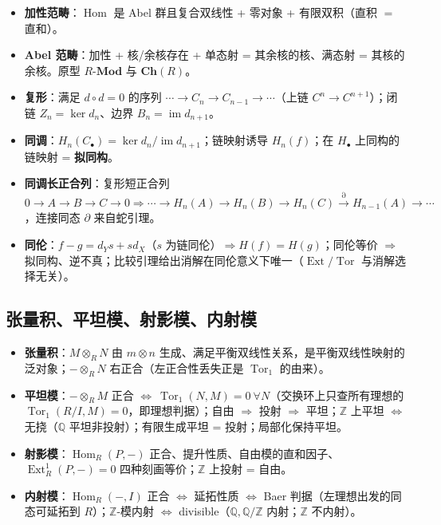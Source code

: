 \documentclass[12pt,a4paper]{ctexart}
\DeclareMathOperator{\Hom}{Hom}
\DeclareMathOperator{\Ext}{Ext}
\DeclareMathOperator{\Tor}{Tor}
\DeclareMathOperator{\im}{im}
\begin{document}
\begin{itemize}
  \item \textbf{加性范畴}：$\Hom$ 是 Abel 群且复合双线性 + 零对象 + 有限双积（直积 $=$ 直和）。
  \item \textbf{Abel 范畴}：加性 + 核/余核存在 + 单态射 = 其余核的核、满态射 = 其核的余核。原型 $R\text{-}\mathbf{Mod}$ 与 $\mathbf{Ch}(R)$。
  \item \textbf{复形}：满足 $d\circ d=0$ 的序列 $\cdots\to C_n\to C_{n-1}\to\cdots$（上链 $C^n\to C^{n+1}$）；闭链 $Z_n=\ker d_n$、边界 $B_n=\im d_{n+1}$。
  \item \textbf{同调}：$H_n(C_\bullet)=\ker d_n/\im d_{n+1}$；链映射诱导 $H_n(f)$；在 $H_\bullet$ 上同构的链映射 = \textbf{拟同构}。
  \item \textbf{同调长正合列}：复形短正合列 $0\to A\to B\to C\to0\Rightarrow\cdots\to H_n(A)\to H_n(B)\to H_n(C)\xrightarrow{\partial}H_{n-1}(A)\to\cdots$，连接同态 $\partial$ 来自蛇引理。
  \item \textbf{同伦}：$f-g=d_Ys+sd_X$（$s$ 为链同伦）$\Rightarrow H(f)=H(g)$；同伦等价 $\Rightarrow$ 拟同构、逆不真；比较引理给出消解在同伦意义下唯一（$\Ext/\Tor$ 与消解选择无关）。
\end{itemize}

\subsection{张量积、平坦模、射影模、内射模}

\begin{itemize}
  \item \textbf{张量积}：$M\otimes_RN$ 由 $m\otimes n$ 生成、满足平衡双线性关系，是平衡双线性映射的泛对象；$-\otimes_RN$ 右正合（左正合性丢失正是 $\Tor_1$ 的由来）。
  \item \textbf{平坦模}：$-\otimes_RM$ 正合 $\Longleftrightarrow\ \Tor_1(N,M)=0\ \forall N$（交换环上只查所有理想的 $\Tor_1(R/I,M)=0$，即理想判据）；自由 $\Rightarrow$ 投射 $\Rightarrow$ 平坦；$\mathbb Z$ 上平坦 $\Longleftrightarrow$ 无挠（$\mathbb Q$ 平坦非投射）；有限生成平坦 = 投射；局部化保持平坦。
  \item \textbf{射影模}：$\Hom_R(P,-)$ 正合、提升性质、自由模的直和因子、$\Ext^1_R(P,-)=0$ 四种刻画等价；$\mathbb Z$ 上投射 = 自由。
  \item \textbf{内射模}：$\Hom_R(-,I)$ 正合 $\Longleftrightarrow$ 延拓性质 $\Longleftrightarrow$ Baer 判据（左理想出发的同态可延拓到 $R$）；$\mathbb Z$-模内射 $\Longleftrightarrow$ divisible（$\mathbb Q,\mathbb Q/\mathbb Z$ 内射；$\mathbb Z$ 不内射）。
\end{itemize}
\end{document}
